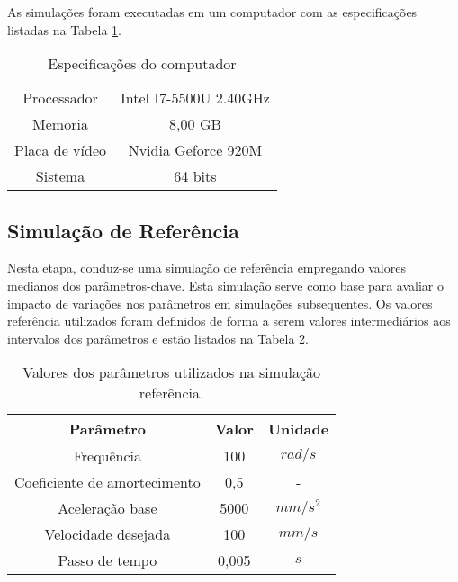 As simulações foram executadas em um computador com as especificações listadas na Tabela \ref{tab:note_config}.

\begin{table}
    \begin{center}
    \caption{Especificações do computador}
    \label{tab:note_config}
    \begin{tabular}{c c}
        \hline
        Processador & Intel I7-5500U 2.40GHz \\
        Memoria & 8,00 GB \\
        Placa de vídeo & Nvidia Geforce 920M \\
        Sistema & 64 bits \\ \hline
    \end{tabular}
    \end{center}
\end{table}

\subsection{Simulação de Referência}
Nesta etapa, conduz-se uma simulação de referência empregando valores medianos dos parâmetros-chave. Esta simulação serve como base para avaliar o impacto de variações nos parâmetros em simulações subsequentes. Os valores referência utilizados foram definidos de forma a serem valores intermediários aos intervalos dos parâmetros e estão listados na Tabela \ref{tab:base_params}.

\begin{table}
    \begin{center}
    \caption{Valores dos parâmetros utilizados na simulação referência.}
    \label{tab:base_params}
    \begin{tabular}{c c c}
        Parâmetro & Valor & Unidade\\ \hline
        Frequência & 100 & $rad/s$\\
        Coeficiente de amortecimento & 0,5 & - \\
        Aceleração base & 5000 & $mm/s^2$ \\
        Velocidade desejada & 100 & $mm/s$ \\
        Passo de tempo & 0,005 & $s$ \\ \hline
    \end{tabular}
    \end{center}
\end{table}

